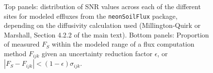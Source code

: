 \documentclass[
  letterpaper,
  DIV=11,
  numbers=noendperiod]{scrartcl}
\begin{document}
\begin{figure}


\caption{\label{fig-uncertainty-stats}Top panels: distribution of SNR
values across each of the different sites for modeled effluxes from the
\texttt{neonSoilFlux} package, depending on the diffusivity calculation
used (Millington-Quirk or Marshall, Section 4.2.2 of the main text).
Bottom panels: Proportion of measured \(F_{S}\) within the modeled range
of a flux computation method \(F_{ijk}\) given an uncertainty reduction
factor \(\epsilon\), or
\(| F_{S} - F_{ijk} | < (1-\epsilon) \sigma_{ijk}\).}

\end{figure}%
\end{document}
